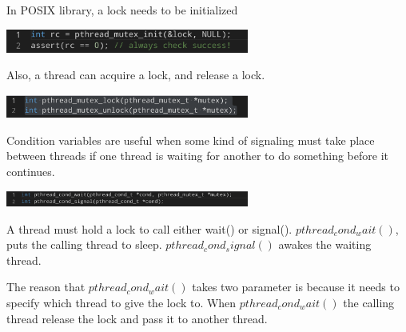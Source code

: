     In POSIX library, a lock needs to be initialized

    \includegraphics[width=0.6\textwidth]{chapters/Cucurrency/Cucurrency/init_lock.png}

    Also, a thread can acquire a lock, and release a lock.

    \includegraphics[width=0.6\textwidth]{chapters/Cucurrency/Cucurrency/lock_unlock.png}



    Condition variables are useful when some kind of signaling must take place
    between threads if one thread is waiting for another to do something before it 
    continues.

    \includegraphics[width=0.6\textwidth]{chapters/Cucurrency/Cucurrency/condtion_wait_signal.png}

    A thread must hold a lock to call either wait() or signal(). 
    $pthread_cond_wait()$, puts the calling thread to sleep.
    $pthread_cond_signal()$ awakes the waiting thread.

    The reason that $pthread_cond_wait()$ takes two parameter is because
    it needs to specify which thread to give the lock to. When $pthread_cond_wait()$
    the calling thread release the lock and pass it to another thread.


